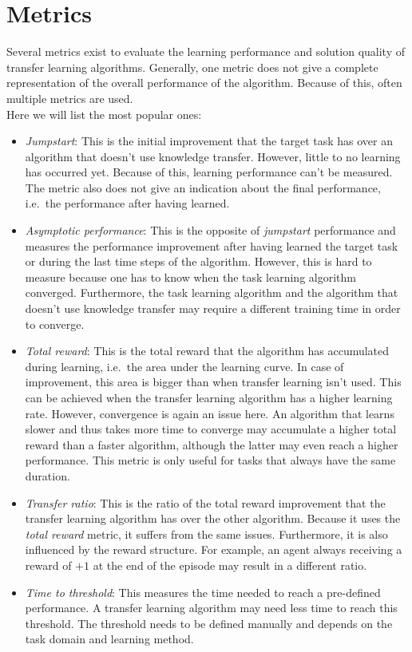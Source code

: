 \section{Metrics}
\label{sub:tl_metrics}
Several metrics exist to evaluate the learning performance and solution quality of transfer learning algorithms. Generally, one metric does not give a complete representation of the overall performance of the algorithm. Because of this, often multiple metrics are used.\\
Here we will list the most popular ones:
\begin{itemize}
    \item \textit{Jumpstart}: This is the initial improvement that the target task has over an algorithm that doesn't use knowledge transfer. However, little to no learning has occurred yet. Because of this, learning performance can't be measured. The metric also does not give an indication about the final performance, i.e.\ the performance after having learned.
    \item \textit{Asymptotic performance}: This is the opposite of \textit{jumpstart} performance and measures the performance improvement after having learned the target task or during the last time steps of the algorithm. However, this is hard to measure because one has to know when the task learning algorithm converged. Furthermore, the task learning algorithm and the algorithm that doesn't use knowledge transfer may require a different training time in order to converge.
    \item \textit{Total reward}: This is the total reward that the algorithm has accumulated during learning, i.e.\ the area under the learning curve. In case of improvement, this area is bigger than when transfer learning isn't used. This can be achieved when the transfer learning algorithm has a higher learning rate.
    However, convergence is again an issue here. An algorithm that learns slower and thus takes more time to converge may accumulate a higher total reward than a faster algorithm, although the latter may even reach a higher performance. This metric is only useful for tasks that always have the same duration.
    \item \textit{Transfer ratio}: This is the ratio of the total reward improvement that the transfer learning algorithm has over the other algorithm. Because it uses the \textit{total reward} metric, it suffers from the same issues. Furthermore, it is also influenced by the reward structure. For example, an agent always receiving a reward of $+1$ at the end of the episode may result in a different ratio.
    \item \textit{Time to threshold}: This measures the time needed to reach a pre-defined performance. A transfer learning algorithm may need less time to reach this threshold. The threshold needs to be defined manually and depends on the task domain and learning method.
\end{itemize}
